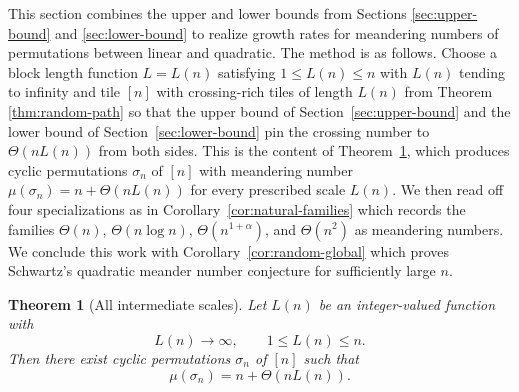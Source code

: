 \documentclass[11pt,a4paper]{amsart}
\newtheorem{theorem}{Theorem}
\theoremstyle{definition}
\theoremstyle{remark}
\begin{document}
This section combines the upper and lower bounds from Sections \ref{sec:upper-bound} and \ref{sec:lower-bound} to realize growth rates for meandering numbers of permutations between linear and quadratic.  The method is as follows.  Choose a block length function $L=L(n)$ satisfying $1 \leq L(n) \leq n$ with $L(n)$ tending to infinity and tile $[n]$ with crossing-rich tiles of length $L(n)$ from Theorem \ref{thm:random-path} so that the upper bound of Section~\ref{sec:upper-bound} and the lower bound of Section~\ref{sec:lower-bound} pin the crossing number to $\Theta(nL(n))$ from both sides.  This is the content of Theorem~\ref{thm:intermediate}, which produces cyclic permutations $\sigma_{n}$ of $[n]$ with meandering number $\mu(\sigma_{n}) = n+\Theta(nL(n))$ for every prescribed scale $L(n)$.  We then read off four specializations as in Corollary~\ref{cor:natural-families} which records the families $\Theta(n)$, $\Theta(n\log n)$, $\Theta(n^{1+\alpha})$, and $\Theta(n^2)$ as meandering numbers.  We conclude this work with Corollary~\ref{cor:random-global} which proves Schwartz's quadratic meander number conjecture for sufficiently large $n$.


\begin{theorem}[All intermediate scales]\label{thm:intermediate}
Let $L(n)$ be an integer-valued function with
\begin{equation*}
        L(n)\to\infty,
        \qquad
        1\le L(n)\le n.
\end{equation*}
Then there exist cyclic permutations $\sigma_n$ of $[n]$ such that
\begin{equation*}
        \mu(\sigma_n)=n+\Theta(nL(n)).
\end{equation*}
\end{theorem}
\end{document}
